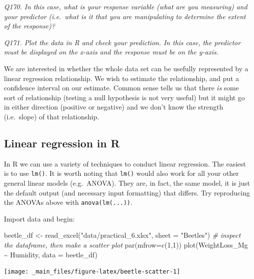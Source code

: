 \documentclass[
  11pt,
  a4paper,
]{book}
\newenvironment{Shaded}{\begin{snugshade}}{\end{snugshade}}
\newcommand{\AttributeTok}[1]{\textcolor[rgb]{0.77,0.63,0.00}{#1}}
\newcommand{\CommentTok}[1]{\textcolor[rgb]{0.56,0.35,0.01}{\textit{#1}}}
\newcommand{\DecValTok}[1]{\textcolor[rgb]{0.00,0.00,0.81}{#1}}
\newcommand{\FunctionTok}[1]{\textcolor[rgb]{0.00,0.00,0.00}{#1}}
\newcommand{\NormalTok}[1]{#1}
\newcommand{\OtherTok}[1]{\textcolor[rgb]{0.56,0.35,0.01}{#1}}
\newcommand{\SpecialCharTok}[1]{\textcolor[rgb]{0.00,0.00,0.00}{#1}}
\newcommand{\StringTok}[1]{\textcolor[rgb]{0.31,0.60,0.02}{#1}}
\begin{document}
\emph{Q170. In this case, what is your response variable (what are you measuring) and your predictor (i.e.~what is it that you are manipulating to determine the extent of the response)?}

\emph{Q171. Plot the data in R and check your prediction. In this case, the predictor must be displayed on the x-axis and the response must be on the y-axis.}

We are interested in whether the whole data set can be usefully represented by a linear regression relationship. We wish to estimate the relationship, and put a confidence interval on our estimate. Common sense tells us that there \emph{is} some sort of relationship (testing a null hypothesis is not very useful) but it might go in either direction (positive or negative) and we don't know the strength (i.e.~slope) of that relationship.

\hypertarget{linear-regression-in-r}{%
\subsection{Linear regression in R}\label{linear-regression-in-r}}

In R we can use a variety of techniques to conduct linear regression. The easiest is to use \texttt{lm()}. It is worth noting that \texttt{lm()} would also work for all your other general linear models (e.g.~ANOVA). They are, in fact, the same model, it is just the default output (and necessary input formatting) that differs. Try reproducing the ANOVAs above with \texttt{anova(lm(...))}.

Import data and begin:

\begin{Shaded}
\begin{Highlighting}[]
\NormalTok{beetle\_df }\OtherTok{\textless{}{-}} \FunctionTok{read\_excel}\NormalTok{(}\StringTok{"data/practical\_6.xlsx"}\NormalTok{, }\AttributeTok{sheet =} \StringTok{"Beetles"}\NormalTok{)}
\CommentTok{\# inspect the dataframe, then make a scatter plot}
\FunctionTok{par}\NormalTok{(}\AttributeTok{mfrow=}\FunctionTok{c}\NormalTok{(}\DecValTok{1}\NormalTok{,}\DecValTok{1}\NormalTok{))}
\FunctionTok{plot}\NormalTok{(WeightLoss\_Mg }\SpecialCharTok{\textasciitilde{}}\NormalTok{ Humidity, }\AttributeTok{data =}\NormalTok{ beetle\_df) }
\end{Highlighting}
\end{Shaded}

\begin{center}\texttt{[image: \_main\_files/figure-latex/beetle-scatter-1]} \end{center}
\end{document}
